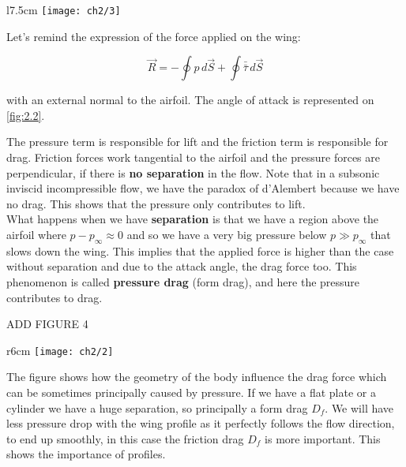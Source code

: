 		\begin{wrapfigure}[9]{l}{7.5cm}
		\vspace{-5mm}
		\texttt{[image: ch2/3]}
		\label{fig:2.2}
		\end{wrapfigure}
		Let's remind the expression of the force applied on the wing:
		
		\begin{equation}
		\vec{R} = -\oint p \, d\vec{S} + \oint \bar{\bar{\tau}} \, d\vec{S} 
		\end{equation}
		
		with an external normal to the airfoil. The angle of attack is represented on \autoref{fig:2.2}.

		The pressure term is responsible for lift and the friction term is responsible for drag. Friction forces work tangential to the airfoil and the pressure forces are perpendicular, if there is \textbf{no separation} in the flow. 
		Note that in a subsonic inviscid incompressible flow, we have the paradox of d’Alembert because we have no drag. This shows that the pressure only contributes to lift. \\

		What happens when we have \textbf{separation} is that we have a region above the airfoil where $p-p_\infty \approx 0$ and so we have a very big pressure below $p\gg p_\infty$ that slows down the wing. This implies that the applied force is higher than the case without separation and due to the attack angle, the drag force too. This phenomenon is called \textbf{pressure drag} (form drag), and here the pressure contributes to drag.
		
		\begin{center}
		ADD FIGURE 4
		\end{center}
		
		\begin{wrapfigure}[15]{r}{6cm}
		\vspace{-5mm}
		\texttt{[image: ch2/2]}
		\end{wrapfigure}
		The figure shows how the geometry of the body influence the drag force which can be sometimes principally caused by pressure. If we have a flat plate or a cylinder we have a huge separation, so principally a form drag $D_f$. We will have less pressure drop with the wing profile as it perfectly follows the flow direction, to end up smoothly, in this case the friction drag $D_f$ is more important. This shows the importance of profiles. \\
		
